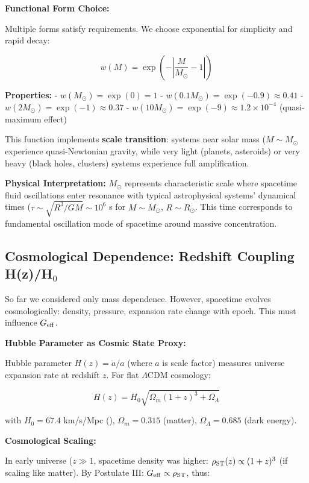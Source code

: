 \documentclass[11pt,a4paper]{article}
\begin{document}
\textbf{Functional Form Choice:}

Multiple forms satisfy requirements. We choose exponential for
simplicity and rapid decay:

\[w(M) = \exp\left(-\left|\frac{M}{M_\odot} - 1\right|\right)\]

\textbf{Properties:} - \(w(M_\odot) = \exp(0) = 1\) \checkmark{} -
\(w(0.1 M_\odot) = \exp(-0.9) \approx 0.41\) -
\(w(2 M_\odot) = \exp(-1) \approx 0.37\) -
\(w(10 M_\odot) = \exp(-9) \approx 1.2 \times 10^{-4}\) (quasi-maximum
effect)

This function implements \textbf{scale transition}: systems near solar
mass (\(M \sim M_\odot\) experience quasi-Newtonian gravity, while very
light (planets, asteroids) or very heavy (black holes, clusters) systems
experience full amplification.

\textbf{Physical Interpretation:} \(M_\odot\) represents characteristic
scale where spacetime fluid oscillations enter resonance with typical
astrophysical systems' dynamical times
(\(\tau \sim \sqrt{R^3/GM} \sim 10^6\) s for \(M \sim M_\odot\),
\(R \sim R_\odot\). This time corresponds to fundamental oscillation
mode of spacetime around massive concentration.

\hypertarget{cosmological-dependence-redshift-coupling-hzhux2080}{%
\subsection{Cosmological Dependence: Redshift Coupling H(z)/H$_{0}$}\label{cosmological-dependence-redshift-coupling-hzhux2080}}

So far we considered only mass dependence. However, spacetime evolves
cosmologically: density, pressure, expansion rate change with epoch.
This must influence \(G_{\rm eff}\).

\textbf{Hubble Parameter as Cosmic State Proxy:}

Hubble parameter \(H(z) = \dot{a}/a\) (where \(a\) is scale factor)
measures universe expansion rate at redshift \(z\). For flat
\(\Lambda\)CDM cosmology:

\[H(z) = H_0 \sqrt{\Omega_m (1+z)^3 + \Omega_\Lambda}\]

with \(H_0 = 67.4\) km/s/Mpc (\cite{PlanckCollaboration2020a}), \(\Omega_m = 0.315\)
(matter), \(\Omega_\Lambda = 0.685\) (dark energy).

\textbf{Cosmological Scaling:}

In early universe (\(z \gg 1\), spacetime density was higher:
\(\rho_{\rm ST}(z) \propto (1+z)^3\) (if scaling like matter). By
Postulate III: \(G_{\rm eff} \propto \rho_{\rm ST}\), thus:
\end{document}
